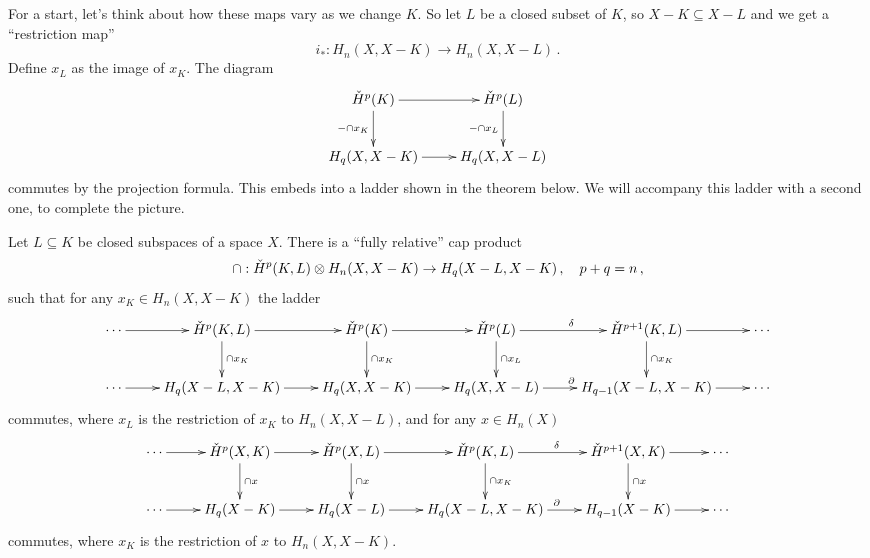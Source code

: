 For a start, let's think about how these maps vary as we change $K$.
So let $L$ be a closed subset of $K$, so $X-K\subseteq X-L$ and we get 
a ``restriction map''
\[
i_\ast:H_n(X,X-K)\to H_n(X,X-L)\,.
\]
Define $x_L$ as the image of $x_K$. The diagram
\begin{equation*}
\xymatrix{
\cHH^p(K)\ar[r]\ar[d]_{-\cap x_K} & \cHH^p(L) \ar[d]_{-\cap x_L} \\
H_q(X,X-K)\ar[r] & H_q(X,X-L)
}
\end{equation*}
commutes by the projection formula. This embeds into a ladder
shown in the theorem below. We will accompany this ladder with a second
one, to complete the picture.
\begin{theorem}
Let $L\subseteq K$ be closed subspaces of a space  $X$.
There is a ``fully relative'' cap product
\[
\cap:\check{H}^p(K,L)\otimes H_n(X,X-K)\to H_q(X-L,X-K)\,,\quad p+q=n\,,
\]
such that for any $x_K\in H_n(X,X-K)$ the ladder
\begin{equation*}
\xymatrix{
\cdots \ar[r] & \cHH^p(K,L)\ar[r]\ar[d]^{\cap x_{K}} & \cHH^p(K)\ar[r]\ar[d]^{\cap x_K} & \cHH^p(L)\ar[r]^\delta\ar[d]^{\cap x_L} & \cHH^{p+1}(K,L)\ar[r]\ar[d]^{\cap x_{K}} & \cdots\\
	\cdots\ar[r] & H_q(X-L,X-K)\ar[r]& H_q(X,X-K)\ar[r] & H_q(X,X-L)\ar[r]^\partial & H_{q-1}(X-L,X-K)\ar[r] & \cdots
}
\end{equation*}
commutes, where $x_L$ is the restriction of $x_K$ to $H_n(X,X-L)$, 
and for any $x\in H_n(X)$
\[
\xymatrix{
\cdots \ar[r] & \cHH^p(X,K) \ar[d]^{\cap x} \ar[r] & 
\cHH^p(X,L) \ar[d]^{\cap x} \ar[r] & 
\cHH^p(K,L) \ar[d]^{\cap x_K} \ar[r]^\delta &
\cHH^{p+1}(X,K) \ar[d]^{\cap x} \ar[r] & \cdots\\
\cdots \ar[r] & H_q(X-K) \ar[r] & H_q(X-L) \ar[r] & 
H_q(X-L,X-K) \ar[r]^\partial & H_{q-1}(X-K) \ar[r] & \cdots
}\]
commutes, where $x_K$ is the restriction of $x$ to $H_n(X,X-K)$. 
\end{theorem}
